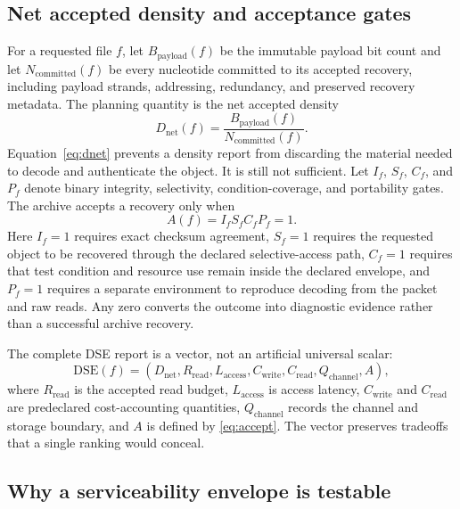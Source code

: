 \documentclass[conference]{IEEEtran}
\begin{document}
\subsection{Net accepted density and acceptance gates}

For a requested file $f$, let $B_{\mathrm{payload}}(f)$ be the immutable payload bit count and let $N_{\mathrm{committed}}(f)$ be every nucleotide committed to its accepted recovery, including payload strands, addressing, redundancy, and preserved recovery metadata. The planning quantity is the net accepted density
\begin{equation}
D_{\mathrm{net}}(f)=\frac{B_{\mathrm{payload}}(f)}{N_{\mathrm{committed}}(f)}.
\label{eq:dnet}
\end{equation}
Equation~\eqref{eq:dnet} prevents a density report from discarding the material needed to decode and authenticate the object. It is still not sufficient. Let $I_f$, $S_f$, $C_f$, and $P_f$ denote binary integrity, selectivity, condition-coverage, and portability gates. The archive accepts a recovery only when
\begin{equation}
A(f)=I_f S_f C_f P_f=1.
\label{eq:accept}
\end{equation}
Here $I_f=1$ requires exact checksum agreement, $S_f=1$ requires the requested object to be recovered through the declared selective-access path, $C_f=1$ requires that test condition and resource use remain inside the declared envelope, and $P_f=1$ requires a separate environment to reproduce decoding from the packet and raw reads. Any zero converts the outcome into diagnostic evidence rather than a successful archive recovery.

The complete DSE report is a vector, not an artificial universal scalar:
\begin{equation}
\mathrm{DSE}(f)=\left(D_{\mathrm{net}},R_{\mathrm{read}},L_{\mathrm{access}},C_{\mathrm{write}},C_{\mathrm{read}},Q_{\mathrm{channel}},A\right),
\label{eq:dse}
\end{equation}
where $R_{\mathrm{read}}$ is the accepted read budget, $L_{\mathrm{access}}$ is access latency, $C_{\mathrm{write}}$ and $C_{\mathrm{read}}$ are predeclared cost-accounting quantities, $Q_{\mathrm{channel}}$ records the channel and storage boundary, and $A$ is defined by \eqref{eq:accept}. The vector preserves tradeoffs that a single ranking would conceal.

\subsection{Why a serviceability envelope is testable}
\end{document}
